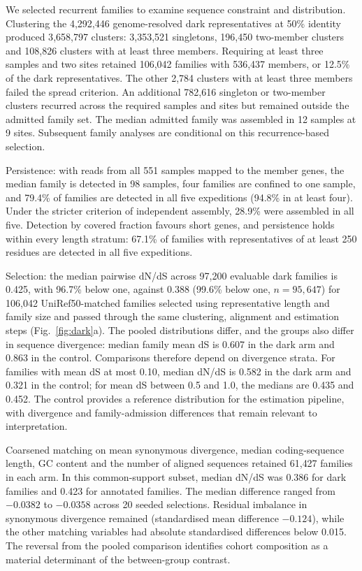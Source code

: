 \documentclass[11pt]{article}
\begin{document}
We selected recurrent families to examine sequence constraint and distribution. Clustering the
4{,}292{,}446 genome-resolved dark representatives at 50\% identity produced 3{,}658{,}797 clusters:
3{,}353{,}521 singletons, 196{,}450 two-member clusters and 108{,}826 clusters with at least three
members. Requiring at least three samples and two sites retained 106{,}042 families with 536{,}437
members, or 12.5\% of the dark representatives. The other 2{,}784 clusters with at least three
members failed the spread criterion. An additional 782{,}616 singleton or two-member clusters
recurred across the required samples and sites but remained outside the admitted family set.
The median admitted family was assembled in 12 samples at 9 sites. Subsequent family analyses
are conditional on this recurrence-based selection.

Persistence: with reads from all 551 samples mapped to the member genes, the median family is
detected in 98 samples, four families are confined to one sample, and 79.4\% of families are detected
in all five expeditions (94.8\% in at least four). Under the stricter criterion of independent
assembly, 28.9\% were assembled in all five. Detection by covered fraction
favours short genes, and persistence holds within every length stratum: 67.1\% of families with
representatives of at least 250 residues are detected in all five expeditions.

Selection: the median pairwise dN/dS across 97{,}200 evaluable dark families is 0.425, with 96.7\%
below one, against 0.388 (99.6\% below one, $n = 95{,}647$) for 106{,}042 UniRef50-matched families
selected using representative length and family size and passed through the same clustering,
alignment and estimation steps (Fig.~\ref{fig:dark}a). The pooled distributions differ, and the groups also differ in sequence divergence: median
family mean dS is 0.607 in the dark arm and 0.863 in the control. Comparisons therefore depend
on divergence strata. For families with mean dS at most 0.10, median dN/dS is 0.582 in the dark
arm and 0.321 in the control; for mean dS between 0.5 and 1.0, the medians are 0.435 and 0.452.
The control provides a reference distribution for the estimation pipeline, with divergence and
family-admission differences that remain relevant to interpretation.

Coarsened matching on mean synonymous divergence, median coding-sequence length, GC content
and the number of aligned sequences retained 61{,}427 families in each arm. In this common-support
subset, median dN/dS was 0.386 for dark families and 0.423 for annotated families. The median
difference ranged from $-0.0382$ to $-0.0358$ across 20 seeded selections. Residual imbalance in
synonymous divergence remained (standardised mean difference $-0.124$), while the other matching
variables had absolute standardised differences below 0.015. The reversal from the pooled
comparison identifies cohort composition as a material determinant of the between-group contrast.
\end{document}
